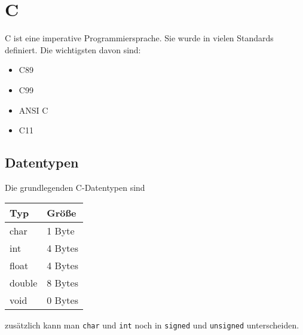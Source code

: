\chapter{C}
C ist eine imperative Programmiersprache. Sie wurde in vielen Standards
definiert. Die wichtigsten davon sind:

\begin{itemize}
    \item C89
    \item C99
    \item ANSI C
    \item C11
\end{itemize}

\section{Datentypen}
Die grundlegenden C-Datentypen sind
\begin{table}[htp]
    \centering
    \begin{tabular}{|l|l|}
    \hline
    \textbf{Typ}    & \textbf{Größe}   \\ \hline\hline
    char   & 1 Byte  \\ \hline
    int    & 4 Bytes \\ \hline
    float  & 4 Bytes \\ \hline
    double & 8 Bytes \\ \hline
    void   & 0 Bytes \\ \hline
    \end{tabular}
\end{table}

zusätzlich kann man \texttt{char} und \texttt{int}
noch in \texttt{signed} und \texttt{unsigned}
unterscheiden.

